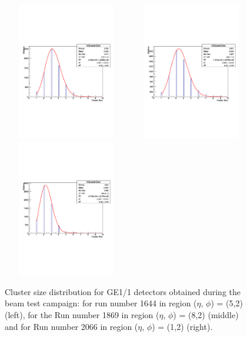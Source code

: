 \begin{figure}[!htbp]
    \centering
    \includegraphics[width=5.5cm,height=6cm]{figures/GEM/Run1644.pdf}%
    \includegraphics[width=5.5cm,height=6cm]{figures/GEM/Run1869.pdf}%
    \includegraphics[width=5.5cm,height=6cm]{figures/GEM/Run2066.pdf}
    \caption{Cluster size distribution for GE1/1 detectors obtained during the beam test campaign: for run number 1644 in region ($\eta$, $\phi$) = (5,2) (left), for the Run number 1869 in region ($\eta$, $\phi$) = (8,2) (middle) and for Run number 2066 in region ($\eta$, $\phi$) = (1,2) (right).}
    \label{fig:CSDpoissonfunction}
\end{figure}
